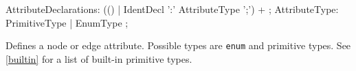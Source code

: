\begin{rail}    
  AttributeDeclarations: (() | IdentDecl ':' AttributeType ';') + ;
  AttributeType: PrimitiveType | EnumType ; 
\end{rail}
Defines a node or edge attribute. Possible types are \texttt{enum} and primitive types. See \ref{builtin} for a list of built-in primitive types.


